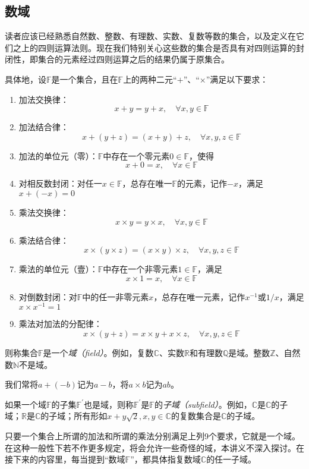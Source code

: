 \documentclass[../main.tex]{subfiles}
\begin{document}
\subsection{数域}\label{sec:II.2.1.1}
读者应该已经熟悉自然数、整数、有理数、实数、复数等数的集合，以及定义在它们之上的四则运算法则。现在我们特别关心这些数的集合是否具有对四则运算的封闭性，即集合的元素经过四则运算之后的结果仍属于原集合。

具体地，设$\mathbb{F}$是一个集合，且在$\mathbb{F}$上的两种二元“$+$”、“$\times$”满足以下要求：
\begin{enumerate}
    \item 加法交换律：\[x+y=y+x,\quad\forall x,y\in\mathbb{F}\]
    \item 加法结合律：\[x+\left(y+z\right)=\left(x+y\right)+z,\quad\forall x,y,z\in\mathbb{F}\]
    \item 加法的单位元（零）：$\mathbb{F}$中存在一个零元素$0\in\mathbb{F}$，使得\[x+0=x,\quad\forall x\in\mathbb{F}\]
    \item 对相反数封闭：对任一$x\in\mathbb{F}$，总存在唯一$\mathbb{F}$的元素，记作$-x$，满足$x+\left(-x\right)=0$
    \item 乘法交换律：\[x\times y=y\times x,\quad\forall x,y\in\mathbb{F}\]
    \item 乘法结合律：\[x\times\left(y\times z\right)=\left(x\times y\right)\times z,\quad\forall x,y,z\in\mathbb{F}\]
    \item 乘法的单位元（壹）：$\mathbb{F}$中存在一个非零元素$1\in\mathbb{F}$，满足\[x\times 1=x,\quad\forall x\in\mathbb{F}\]
    \item 对倒数封闭：对$\mathbb{F}$中的任一非零元素$x$，总存在唯一元素，记作$x^{-1}$或$1/x$，满足$x\times x^{-1}=1$
    \item 乘法对加法的分配律：\[x\times\left(y+z\right)=x\times y+x\times z,\quad\forall x,y,z\in\mathbb{F}\]
\end{enumerate}
则称集合$\mathbb{F}$是一个\emph{域（field）}。例如，复数$\mathbb{C}$、实数$\mathbb{R}$和有理数$\mathbb{Q}$是域。整数$\mathbb{Z}$、自然数$\mathbb{N}$不是域。

我们常将$a+\left(-b\right)$记为$a-b$，将$a\times b$记为$ab$。

如果一个域$\mathbb{F}$的子集$\mathbb{F}^\prime$也是域，则称$\mathbb{F}^\prime$是$\mathbb{F}$的\emph{子域（subfield）}。例如，$\mathbb{C}$是$\mathbb{C}$的子域；$\mathbb{R}$是$\mathbb{C}$的子域；所有形如$x+y\sqrt{2},x,y\in\mathbb{C}$的复数集合是$\mathbb{C}$的子域。

只要一个集合上所谓的加法和所谓的乘法分别满足上列9个要求，它就是一个域。在这种一般性下若不作更多规定，将会允许一些奇怪的域，本讲义不深入探讨。在接下来的内容里，每当提到“数域$\mathbb{F}$”，都具体指复数域$\mathbb{C}$的任一子域。
\end{document}
